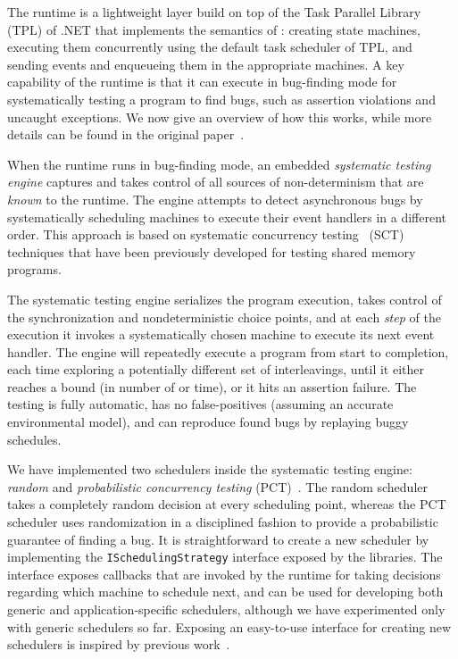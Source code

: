 The \psharp runtime is a lightweight layer build on top of the Task Parallel Library (TPL) of .NET that implements the semantics of \psharp: creating state machines, executing them concurrently using the default task scheduler of TPL, and sending events and enqueueing them in the appropriate machines. A key capability of the \psharp runtime is that it can execute in bug-finding mode for systematically testing a \psharp program to find bugs, such as assertion violations and uncaught exceptions. We now give an overview of how this works, while more details can be found in the original paper~\cite{deligiannis2015psharp}.

When the \psharp runtime runs in bug-finding mode, an embedded \emph{systematic testing engine} captures and takes control of all sources of non-determinism that are \emph{known} to the \psharp runtime. The engine attempts to detect asynchronous bugs by systematically scheduling machines to execute their event handlers in a different order. This approach is based on systematic concurrency testing~\cite{godefroid1997verisoft, musuvathi2008finding, emmi2011delay} (SCT) techniques that have been previously developed for testing shared memory programs.

The systematic testing engine serializes the program execution, takes control of the synchronization and nondeterministic choice points, and at each \emph{step} of the execution it invokes a systematically chosen \psharp machine to execute its next event handler. The engine will repeatedly execute a program from start to completion, each time exploring a potentially different set of interleavings, until it either reaches a bound (in number of  or time), or it hits an assertion failure. The testing is fully automatic, has no false-positives (assuming an accurate environmental model), and can reproduce found bugs by replaying buggy schedules.

We have implemented two schedulers inside the \psharp systematic testing engine: \emph{random} and \emph{probabilistic concurrency testing} (PCT)~\cite{burckhardt2010pct}. The random scheduler takes a completely random decision at every scheduling point, whereas the PCT scheduler uses randomization in a disciplined fashion to provide a probabilistic guarantee of finding a bug. It is straightforward to create a new scheduler by implementing the \texttt{ISchedulingStrategy} interface exposed by the \psharp libraries. The interface exposes callbacks that are invoked by the \psharp runtime for taking decisions regarding which machine to schedule next, and can be used for developing both generic and application-specific schedulers, although we have experimented only with generic schedulers so far. Exposing an easy-to-use interface for creating new schedulers is inspired by previous work~\cite{desai2015tr}.

